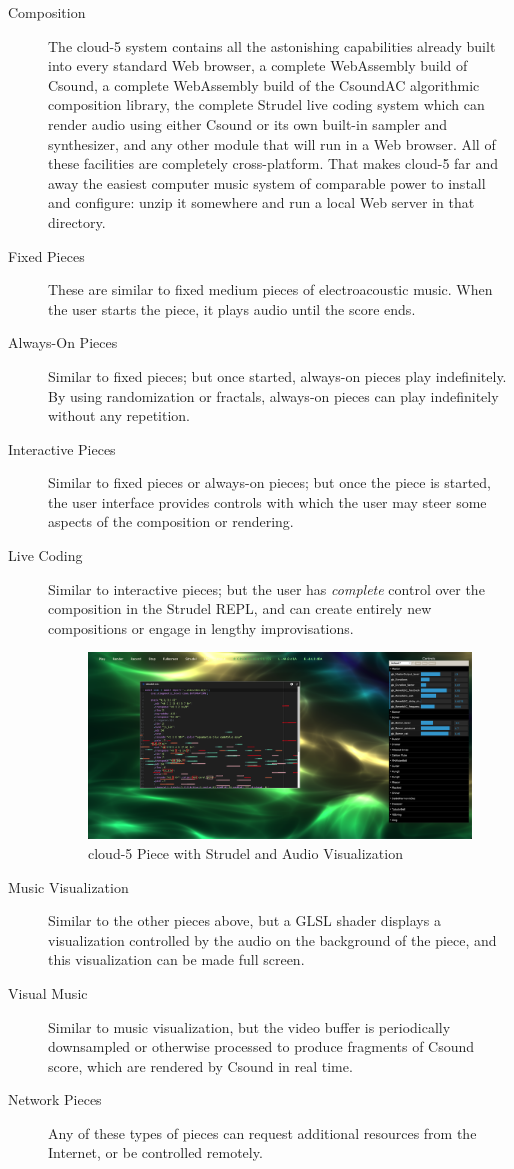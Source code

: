 \documentclass[runningheads,a4paper]{llncs}
\begin{document}
\begin{description}
\item[Composition] The cloud-5 system contains all the astonishing capabilities already built into every standard Web browser, a complete WebAssembly build of Csound, a complete WebAssembly build of the CsoundAC algorithmic composition library, the complete Strudel live coding system which can render audio using either Csound or its own built-in sampler and synthesizer, and any other module that will run in a Web browser. All of these facilities are completely cross-platform. That makes cloud-5 far and away the easiest computer music system of comparable power to install and configure: unzip it somewhere and run a local Web server in that directory. 
\item[Fixed Pieces] These are similar to fixed medium pieces of electroacoustic music. When the user starts the piece, it plays audio until the score ends. 
\item[Always-On Pieces] Similar to fixed pieces; but once started, always-on pieces play indefinitely. By using randomization or fractals, always-on pieces can play indefinitely without any repetition.
\item[Interactive Pieces] Similar to fixed pieces or always-on pieces; but once the piece is started, the user interface provides controls with which the user may steer some aspects of the composition or rendering.
\item[Live Coding] Similar to interactive pieces; but the user has \emph{complete} control over the composition in the Strudel REPL, and can create entirely new compositions or engage in lengthy improvisations.

\begin{figure}
\centering
\includegraphics[width=0.90\linewidth]{cloud5.png}
\caption{cloud-5 Piece with Strudel and Audio Visualization}
\label{fig:cloud5}
\end{figure}

\item[Music Visualization] Similar to the other pieces above, but a GLSL shader displays a visualization controlled by the audio on the background of the piece, and this visualization can be made full screen.
\item[Visual Music] Similar to music visualization, but the video buffer is periodically downsampled or otherwise processed to produce fragments of Csound score, which are rendered by Csound in real time.
\item[Network Pieces] Any of these types of pieces can request additional resources from the Internet, or be controlled remotely.
\end{description}
\end{document}
